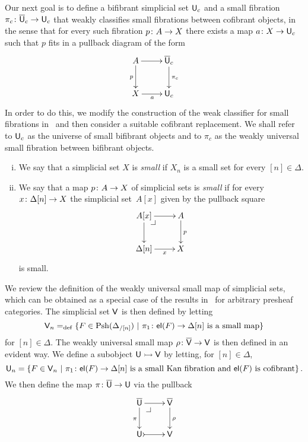 \documentclass[reqno,10pt,a4paper,oneside,draft]{amsart}
\begin{document}
Our next goal is to define a bifibrant simplicial set $\mathsf{U}_c$ and a small fibration $\pi_c \colon \overline{\mathsf{U}}_c \to \mathsf{U}_c$ that weakly classifies small fibrations between cofibrant objects, in the sense that for every such fibration $p \colon A \to X$ there exists a map $a \colon X \to \mathsf{U}_c$ such that $p$ fits in a pullback diagram of the form
\[
\xymatrix{
A \ar[r] \ar[d]_p   & \UU_c \ar[d]^{\pi_c} \\
X \ar[r]_a &  \U_c }
\]
In order to do this, we modify  the construction of the weak classifier for small fibrations 
in~\cite{voevodsky-simplicial-model} and then consider a suitable cofibrant replacement. 
We shall refer to $\mathsf{U}_c$ as the universe of small bifibrant objects and to $\pi_c$ as the 
weakly universal small fibration between bifibrant objects.

\begin{definition} \hfill 
\label{thm:small}
\begin{enumerate}[(i)]
\item We say that a simplicial set $X$ is \emph{small}  if $X_n$ is a small set for every $[n] \in \Delta$. 
\item We say that a map $p \colon A \to X$ of simplicial sets is \emph{small} if for every $x \colon \Delta[n] 
\to X$ the simplicial set~$A[x]$ given by the pullback square
\[
\xymatrix{
A[x] \ar[r] \ar[d] \drpullback & A \ar[d]^{p} \\
\Delta[n] \ar[r]_-{x} & X }
\]
is small.
\end{enumerate}
\end{definition} 





We review the definition of the weakly universal small map of simplicial sets, which
can be obtained as a special case of the results in~\cite{hofmann-streicher-universes} for arbitrary presheaf
categories. The simplicial set $\mathsf{V}$ is then defined by letting
\[
\mathsf{V}_n =_{\operatorname{def}} \{ F \in \mathrm{Psh}(\Delta_{/[n]}) \ | \ \pi_1 \colon \mathsf{el}(F) \to \Delta[n] \text{ is a small
map} \}
\]
for $[n] \in \Delta$. The weakly universal small map $\rho \colon \overline{\mathsf{V}} \to \mathsf{V}$ is then defined in an evident way. 
We define a subobject $\mathsf{U} \rightarrowtail \mathsf{V}$ by letting, for $[n] \in \Delta$, 
\[
\mathsf{U}_n = \{ F \in \mathsf{V}_n \ | \ \pi_1 \colon \mathsf{el}(F) \to \Delta[n] \text{ is a small Kan fibration and $\mathsf{el}(F)$ is cofibrant} \} \, .
\]
We then define the map $\pi \colon \overline{\mathsf{U}} \to \mathsf{U}$ via the pullback 
\[
\xymatrix{
\UU \ar[r] \ar[d]_\pi \drpullback  & \VV \ar[d]^\rho \\
\U \ar@{>->}[r] & \V }
\]
\end{document}
